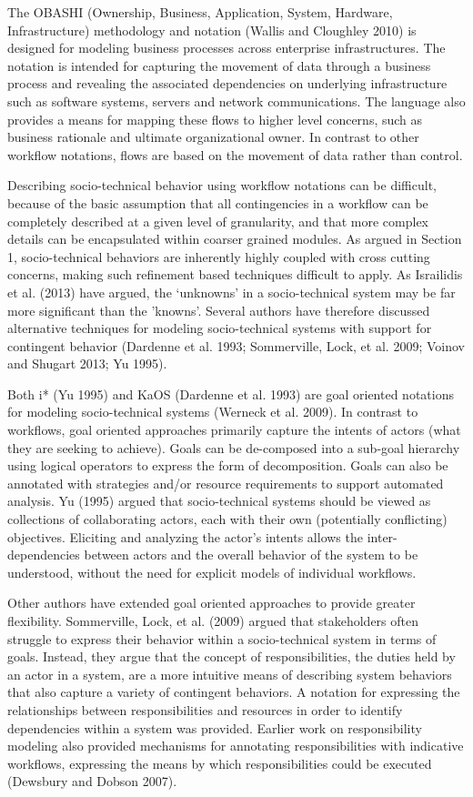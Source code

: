 \documentclass{llncs}
\begin{document}
The OBASHI (Ownership, Business, Application, System, Hardware, Infrastructure) methodology and notation (Wallis and
Cloughley 2010) is designed for modeling business processes across enterprise infrastructures.  The notation is intended
for capturing the movement of data through a business process and revealing the associated dependencies on underlying
infrastructure such as software systems, servers and network communications.  The language also provides a means for
mapping these flows to higher level concerns, such as business rationale and ultimate organizational owner. In contrast
to other workflow notations, flows are based on the movement of data rather than control.

Describing socio-technical behavior using workflow notations can be difficult, because of the basic assumption that all
contingencies in a workflow can be completely described at a given level of granularity, and that more complex details
can be encapsulated within coarser grained modules.  As argued in Section 1, socio-technical behaviors are inherently
highly coupled with cross cutting concerns, making such refinement based techniques difficult to apply.  As Israilidis
et al. (2013) have argued, the ‘unknowns’ in a socio-technical system may be far more significant than the
'knowns'. Several authors have therefore discussed alternative techniques for modeling socio-technical systems with
support for contingent behavior (Dardenne et al. 1993; Sommerville, Lock, et al. 2009; Voinov and Shugart 2013; Yu
1995).

Both i* (Yu 1995) and KaOS (Dardenne et al. 1993) are goal oriented notations for modeling socio-technical systems
(Werneck et al. 2009).  In contrast to workflows, goal oriented approaches primarily capture the intents of actors (what
they are seeking to achieve).  Goals can be de-composed into a sub-goal hierarchy using logical operators to express the
form of decomposition. Goals can also be annotated with strategies and/or resource requirements to support automated
analysis.  Yu (1995) argued that socio-technical systems should be viewed as collections of collaborating actors, each
with their own (potentially conflicting) objectives.  Eliciting and analyzing the actor’s intents allows the
inter-dependencies between actors and the overall behavior of the system to be understood, without the need for explicit
models of individual workflows.

Other authors have extended goal oriented approaches to provide greater flexibility.  Sommerville, Lock, et al. (2009)
argued that stakeholders often struggle to express their behavior within a socio-technical system in terms of goals.
Instead, they argue that the concept of responsibilities, the duties held by an actor in a system, are a more intuitive
means of describing system behaviors that also capture a variety of contingent behaviors.  A notation for expressing the
relationships between responsibilities and resources in order to identify dependencies within a system was provided.
Earlier work on responsibility modeling also provided mechanisms for annotating responsibilities with indicative
workflows, expressing the means by which responsibilities could be executed (Dewsbury and Dobson 2007).
\end{document}
